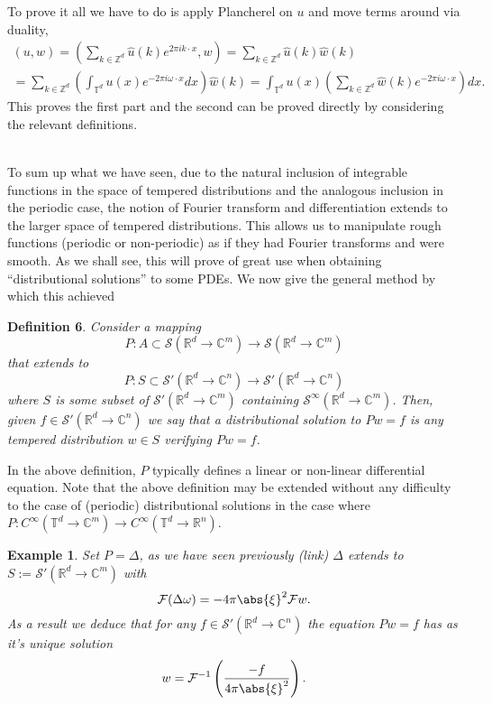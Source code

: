 \documentclass[
]{article}
\begin{document}
To prove it all we have to do is apply Plancherel on \(u\) and move
terms around via duality, \[\begin{gathered}
    (u,w)=(\sum_{k\in {\mathbb Z}^d}\hat{u}(k)e^{2\pi ik\cdot x},w )=\sum_{k\in {\mathbb Z}^d}  \hat{u}(k)\hat{w}(k)\\=\sum_{k\in {\mathbb Z}^d}  \left(\int_{{\mathbb T}^d} u(x)e^{-2\pi i\omega\cdot  x}dx\right)\hat{w}(k)=\int_{{\mathbb T}^d} u(x)\left(\sum_{k\in {\mathbb Z}^d} \hat{w}(k) e^{-2\pi i\omega\cdot  x}\right)dx.\end{gathered}\]
This proves the first part and the second can be proved directly by
considering the relevant definitions.\\
\strut \\
To sum up what we have seen, due to the natural inclusion of integrable
functions in the space of tempered distributions and the analogous
inclusion in the periodic case, the notion of Fourier transform and
differentiation extends to the larger space of tempered distributions.
This allows us to manipulate rough functions (periodic or non-periodic)
as if they had Fourier transforms and were smooth. As we shall see, this
will prove of great use when obtaining ``distributional solutions'' to
some PDEs. We now give the general method by which this achieved

\textbf{Definition 6}. \emph{Consider a mapping
\[P:A\subset{\mathcal S}({\mathbb R}^d\to\mathbb{C}^m)\to {\mathcal S}({\mathbb R}^d\to\mathbb{C}^m)\]
that extends to
\[P:S\subset {\mathcal S}'({\mathbb R}^d\to\mathbb{C}^n)\to {\mathcal S}'({\mathbb R}^d\to\mathbb{C}^n)\]
where \(S\) is some subset of
\({{\mathcal S}'}({\mathbb R}^d\to\mathbb{C}^m)\) containing
\({\mathcal S}^\infty({\mathbb R}^d\to\mathbb{C}^m)\). Then, given
\(f \in {\mathcal S}'({\mathbb R}^d\to \mathbb{C}^n)\) we say that a
\emph{distributional solution} to \(Pw=f\) is any tempered distribution
\(w\in S\) verifying \(Pw=f\).}

In the above definition, \(P\) typically defines a linear or non-linear
differential equation. Note that the above definition may be extended
without any difficulty to the case of (periodic) distributional
solutions in the case where
\(P: C^\infty({\mathbb T}^d\to\mathbb{C}^m)\to C^\infty({\mathbb T}^d\to{\mathbb R}^n)\).

\textbf{Example 1}. \emph{Set \(P=\Delta\), as we have seen previously
(link) \(\Delta\) extends to
\(S:={\mathcal S}'({\mathbb R}^d\to\mathbb{C}^m)\) with
\[\mathcal{F}(\Delta \omega)=-4\pi \abs{\xi }^2\mathcal{F}w .\] As a
result we deduce that for any
\(f \in {\mathcal S}'({\mathbb R}^d\to \mathbb{C}^n)\) the equation
\(Pw=f\) has as it's unique solution
\[w=\mathcal{F}^{-1}\left(\frac{-f}{4\pi \abs{\xi }^2 }\right).\]}
\end{document}
